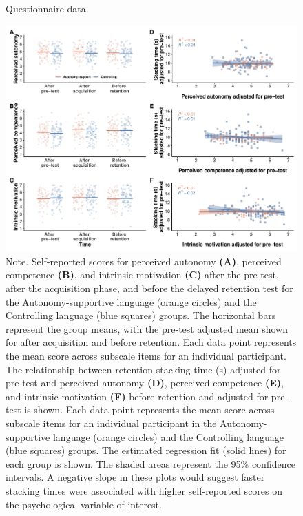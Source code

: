 \documentclass[doc,floatsintext,donotrepeattitle,letterpaper,12pt]{apa7}
\begin{document}
\begin{figure}[htbp]
    \caption{Questionnaire data.}
    \centering
    \includegraphics[scale=0.55]{../../figs/fig3.pdf}
    \setlength{\belowcaptionskip}{-2em}
    \caption*{\singlespacing \small Note. \normalfont Self-reported scores for perceived autonomy \textbf{(A)}, perceived competence \textbf{(B)}, and intrinsic motivation \textbf{(C)} after the pre-test, after the acquisition phase, and before the delayed retention test for the Autonomy-supportive language (orange circles) and the Controlling language (blue squares) groups. The horizontal bars represent the group means, with the pre-test adjusted mean shown for after acquisition and before retention. Each data point represents the mean score across subscale items for an individual participant. The relationship between retention stacking time (s) adjusted for pre-test and perceived autonomy \textbf{(D)}, perceived competence \textbf{(E)}, and intrinsic motivation \textbf{(F)} before retention and adjusted for pre-test is shown. Each data point represents the mean score across subscale items for an individual participant in the Autonomy-supportive language (orange circles) and the Controlling language (blue squares) groups. The estimated regression fit (solid lines) for each group is shown. The shaded areas represent the 95\% confidence intervals. A negative slope in these plots would suggest faster stacking times were associated with higher self-reported scores on the psychological variable of interest.}
    \label{fig:fig3}
\end{figure}
\end{document}
